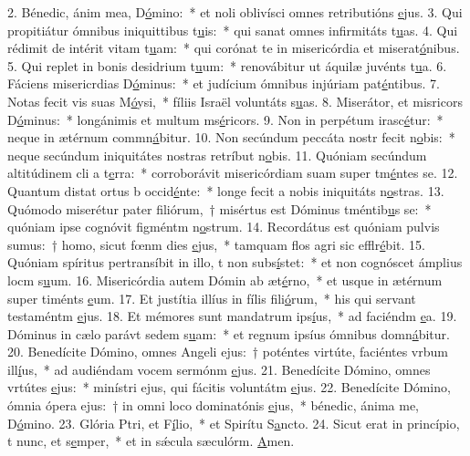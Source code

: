 2. Bénedic, ánim mea, D\uline{ó}mino:~* et noli oblivísci omnes retributións \uline{e}jus.
3. Qui propitiátur ómnibus iniquittibus t\uline{u}is:~* qui sanat omnes infirmitáts t\uline{u}as.
4. Qui rédimit de intérit vitam t\uline{u}am:~* qui corónat te in misericórdia et miserat\uline{ó}nibus.
5. Qui replet in bonis desidrium t\uline{u}um:~* renovábitur ut áquilæ juvénts t\uline{u}a.
6. Fáciens misericrdias D\uline{ó}minus:~* et judícium ómnibus injúriam pat\uline{é}ntibus.
7. Notas fecit vis suas M\uline{ó}ysi,~* fíliis Israël voluntáts s\uline{u}as.
8. Miserátor, et misricors D\uline{ó}minus:~* longánimis et multum ms\uline{é}ricors.
9. Non in perpétum irasc\uline{é}tur:~* neque in ætérnum commn\uline{á}bitur.
10. Non secúndum peccáta nostr fecit n\uline{o}bis:~* neque secúndum iniquitátes nostras retríbut n\uline{o}bis.
11. Quóniam secúndum altitúdinem cli a t\uline{e}rra:~* corroborávit misericórdiam suam super tm\uline{é}ntes se.
12. Quantum distat ortus b occid\uline{é}nte:~* longe fecit a nobis iniquitáts n\uline{o}stras.
13. Quómodo miserétur pater filiórum,~† misértus est Dóminus tméntib\uline{u}s se:~* quóniam ipse cognóvit figméntm n\uline{o}strum.
14. Recordátus est quóniam pulvis sumus:~† homo, sicut fœnm dies \uline{e}jus,~* tamquam flos agri sic efflr\uline{é}bit.
15. Quóniam spíritus pertransíbit in illo, t non subs\uline{í}stet:~* et non cognóscet ámplius locm s\uline{u}um.
16. Misericórdia autem Dómin ab æt\uline{é}rno,~* et usque in ætérnum super timénts \uline{e}um.
17. Et justítia illíus in fílis fili\uline{ó}rum,~* his qui servant testaméntm \uline{e}jus.
18. Et mémores sunt mandatrum ips\uline{í}us,~* ad faciéndm \uline{e}a.
19. Dóminus in cælo parávt sedem s\uline{u}am:~* et regnum ipsíus ómnibus domn\uline{á}bitur.
20. Benedícite Dómino, omnes Angeli ejus:~† poténtes virtúte, faciéntes vrbum ill\uline{í}us,~* ad audiéndam vocem sermónm \uline{e}jus.
21. Benedícite Dómino, omnes vrtútes \uline{e}jus:~* minístri ejus, qui fácitis voluntátm \uline{e}jus.
22. Benedícite Dómino, ómnia ópera ejus:~† in omni loco dominatónis \uline{e}jus,~* bénedic, ánima me, D\uline{ó}mino.
23. Glória Ptri, et F\uline{í}lio,~* et Spirítu S\uline{a}ncto.
24. Sicut erat in princípio, t nunc, et s\uline{e}mper,~* et in sǽcula sæculórm. \uline{A}men.
